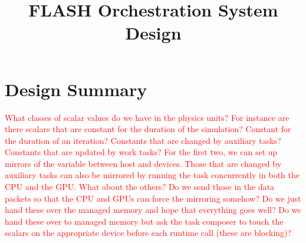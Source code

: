 \documentclass{article}
\title{FLASH Orchestration System Design}
\begin{document}
\theoremstyle{definition} %
\newtheorem{req}{Req}[section]
\newtheorem{spec}{Spec}[section]

\maketitle

\section{Design Summary}
\textcolor{red}{What classes of scalar values do we have in the physics units?
For instance are there scalars that are constant for the duration of the
simulation?  Constant for the duration of an iteration?  Constants that are
changed by auxiliary tasks?  Constants that are updated by work tasks?  For the
first two, we can set up mirrors of the variable between host and devices.
Those that are changed by auxiliary tasks can also be mirrored by running the
task concurrently in both the CPU and the GPU.  What about the others?  Do we
send those in the data packets so that the CPU and GPUs can force the mirroring
somehow?  Do we just hand these over the managed memory and hope that everything
goes well?  Do we hand these over to managed memory but ask the task composer to
touch the scalars on the appropriate device before each runtime call (these are
blocking)?}
\end{document}
